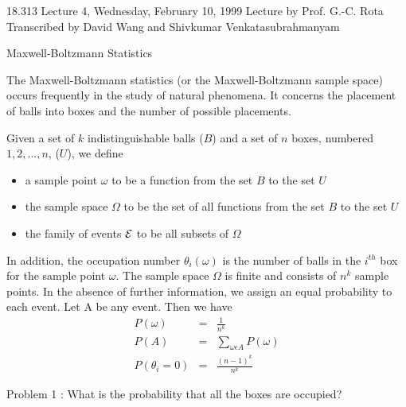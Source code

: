 {\Large 18.313 Lecture 4, Wednesday, February 10, 1999}\newline
{\large Lecture by Prof. G.-C. Rota}\newline
Transcribed by David Wang and Shivkumar Venkatasubrahmanyam\newline

\vspace{1ex}

 Maxwell-Boltzmann Statistics

The Maxwell-Boltzmann statistics (or the Maxwell-Boltzmann sample space) occurs frequently in the study of natural phenomena. It concerns the placement of balls into boxes and the number of possible placements. 

Given a set of $k$ indistinguishable balls ($B$) and a set of $n$ boxes, numbered $1,2,...,n$, ($U$),  we define
\begin{itemize}
\item a sample point $\omega$ to be a function from the set $B$ to the set $U$
\item the sample space $\Omega$ to be the set of all functions from the set $B$ to the set $U$
\item the family of events ${\cal E}$ to be all subsets of $\Omega$
\end{itemize}
\noindent In addition, the occupation number $\theta_{i}(\omega)$ is the number of balls in the $i^{th}$ box for the sample point $\omega$. The sample space $\Omega$ is finite and consists of $n^{k}$ sample points. In the absence of further information, we assign an equal probability to each event. Let A be any event. Then we have
\begin{eqnarray*}
P(\omega) & = & \frac{1}{n^{k}}\\
P(A) & = & \sum_{\omega \epsilon A} P(\omega)\\
P(\theta_{i}=0) & = & \frac{(n-1)^{k}}{n^{k}}
\end{eqnarray*}

\noindent Problem 1 : What is the probability that all the boxes are occupied?

